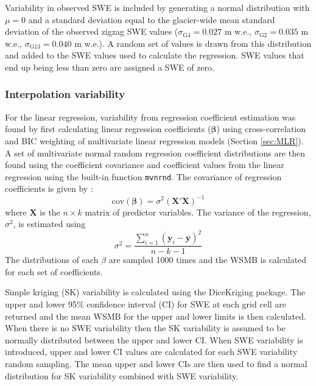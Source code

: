 \documentclass[12pt]{article}
\begin{document}
Variability in observed SWE is included by generating a normal distribution with $\mu=0$ and a standard deviation equal to the glacier-wide mean standard deviation of the observed zigzag SWE values ($\sigma_{\mathrm{G4}} = 0.027 $ m w.e., $\sigma_{\mathrm{G2}} = 0.035$ m w.e., $\sigma_{\mathrm{G13}} = 0.040 $ m w.e.). A random set of values is drawn from this distribution and added to the SWE values used to calculate the regression. SWE values that end up being less than zero are assigned a SWE of zero.

\subsubsection{Interpolation variability}

For the linear regression, variability from regression coefficient estimation was found by first calculating linear regression coefficients ($\boldsymbol{\beta}$) using cross-correlation and BIC weighting of multivariate linear regression models (Section \ref{sec:MLR}). A set of multivariate normal random regression coefficient distributions are then found using the coefficient covariance and coefficient values from the linear regression using the built-in function \texttt{mvnrnd}. The covariance of regression coefficients is given by \citep{Bagos2015}:
\begin{equation}
\mathrm{cov}\left( \boldsymbol{\beta} \right) = \sigma^2 \left( \boldsymbol{X}'  \boldsymbol{X} \right)^{-1}
\end{equation}
where $\boldsymbol{X}$ is the $n \times k$ matrix of predictor variables. The variance of the regression, $\sigma^2$, is estimated using
\begin{equation}
\sigma^2 = \frac{\sum^n_{i=1} \left(\boldsymbol{y}_i-\bar{\boldsymbol{y}} \right)^2}{n-k-1}
\end{equation}
The distributions of each $\beta$ are sampled 1000 times and the WSMB is calculated for each set of coefficients.

Simple kriging (SK) variability is calculated using the DiceKriging package. The upper and lower 95\% confidence interval (CI) for SWE at each grid cell are returned and the mean WSMB for the upper and lower limits is then calculated. When there is no SWE variability then the SK variability is assumed to be normally distributed between the upper and lower CI. When SWE variability is introduced, upper and lower CI values are calculated for each SWE variability random sampling. The mean upper and lower CIs are then used to find a normal distribution for SK variability combined with SWE variability. 
\end{document}
